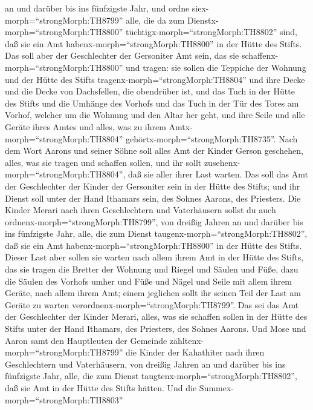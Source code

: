 an und darüber bis ins fünfzigste Jahr, und ordne
siex-morph=``strongMorph:TH8799'' alle, die da zum
Dienstx-morph=``strongMorph:TH8800''
tüchtigx-morph=``strongMorph:TH8802'' sind, daß sie ein Amt
habenx-morph=``strongMorph:TH8800'' in der Hütte des Stifts.
 Das soll aber der Geschlechter der Gersoniter Amt sein,
das sie schaffenx-morph=``strongMorph:TH8800'' und tragen: 
sie sollen die Teppiche der Wohnung und der Hütte des Stifts
tragenx-morph=``strongMorph:TH8804'' und ihre Decke und die Decke von
Dachsfellen, die obendrüber ist, und das Tuch in der Hütte des Stifts
 und die Umhänge des Vorhofs und das Tuch in der Tür des
Tores am Vorhof, welcher um die Wohnung und den Altar her geht, und ihre
Seile und alle Geräte ihres Amtes und alles, was zu ihrem
Amtx-morph=``strongMorph:TH8804'' gehörtx-morph=``strongMorph:TH8735''.
 Nach dem Wort Aarons und seiner Söhne soll alles Amt der
Kinder Gerson geschehen, alles, was sie tragen und schaffen sollen, und
ihr sollt zusehenx-morph=``strongMorph:TH8804'', daß sie aller ihrer
Last warten.  Das soll das Amt der Geschlechter der Kinder
der Gersoniter sein in der Hütte des Stifts; und ihr Dienst soll unter
der Hand Ithamars sein, des Sohnes Aarons, des Priesters. 
Die Kinder Merari nach ihren Geschlechtern und Vaterhäusern sollst du
auch ordnenx-morph=``strongMorph:TH8799'',  von dreißig
Jahren an und darüber bis ins fünfzigste Jahr, alle, die zum Dienst
taugenx-morph=``strongMorph:TH8802'', daß sie ein Amt
habenx-morph=``strongMorph:TH8800'' in der Hütte des Stifts.
 Dieser Last aber sollen sie warten nach allem ihrem Amt in
der Hütte des Stifts, das sie tragen die Bretter der Wohnung und Riegel
und Säulen und Füße,  dazu die Säulen des Vorhofs umher und
Füße und Nägel und Seile mit allem ihrem Geräte, nach allem ihrem Amt;
einem jeglichen sollt ihr seinen Teil der Last am Geräte zu warten
verordnenx-morph=``strongMorph:TH8799''.  Das sei das Amt
der Geschlechter der Kinder Merari, alles, was sie schaffen sollen in
der Hütte des Stifts unter der Hand Ithamars, des Priesters, des Sohnes
Aarons.  Und Mose und Aaron samt den Hauptleuten der
Gemeinde zähltenx-morph=``strongMorph:TH8799'' die Kinder der Kahathiter
nach ihren Geschlechtern und Vaterhäusern,  von dreißig
Jahren an und darüber bis ins fünfzigste Jahr, alle, die zum Dienst
taugtenx-morph=``strongMorph:TH8802'', daß sie Amt in der Hütte des
Stifts hätten.  Und die Summex-morph=``strongMorph:TH8803''
